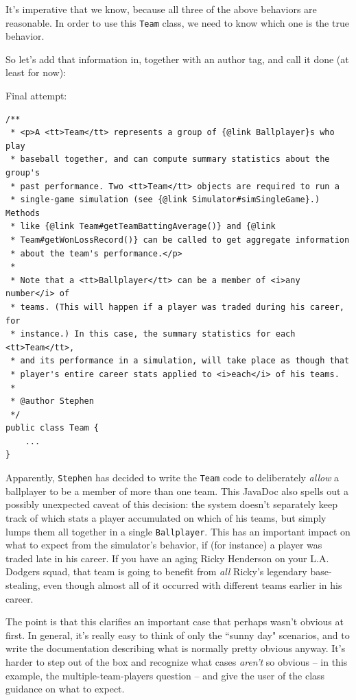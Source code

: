 It's imperative that we know, because all three of the above behaviors are
reasonable. In order to use this \texttt{Team} class, we need to know which
one is the true behavior.

So let's add that information in, together with an author tag, and call it
done (at least for now):

\pagebreak
Final attempt:
\vspace{-.15in}
\begin{Verbatim}[fontsize=\footnotesize,samepage=true,frame=single]
/**
 * <p>A <tt>Team</tt> represents a group of {@link Ballplayer}s who play
 * baseball together, and can compute summary statistics about the group's
 * past performance. Two <tt>Team</tt> objects are required to run a
 * single-game simulation (see {@link Simulator#simSingleGame}.) Methods
 * like {@link Team#getTeamBattingAverage()} and {@link 
 * Team#getWonLossRecord()} can be called to get aggregate information
 * about the team's performance.</p>
 * 
 * Note that a <tt>Ballplayer</tt> can be a member of <i>any number</i> of
 * teams. (This will happen if a player was traded during his career, for
 * instance.) In this case, the summary statistics for each <tt>Team</tt>, 
 * and its performance in a simulation, will take place as though that
 * player's entire career stats applied to <i>each</i> of his teams.
 *
 * @author Stephen
 */
public class Team {
    ...
}
\end{Verbatim}

Apparently, \texttt{Stephen} has decided to write the \texttt{Team} code to
deliberately \textit{allow} a ballplayer to be a member of more than one team.
This JavaDoc also spells out a possibly unexpected caveat of this decision:
the system doesn't separately keep track of which stats a player accumulated
on which of his teams, but simply lumps them all together in a single
\texttt{Ballplayer}. This has an important impact on what to expect from the
simulator's behavior, if (for instance) a player was traded late in his
career. If you have an aging Ricky Henderson on your L.A. Dodgers squad, that
team is going to benefit from \textit{all} Ricky's legendary base-stealing,
even though almost all of it occurred with different teams earlier in his
career.

The point is that this clarifies an important case that perhaps wasn't obvious
at first. In general, it's really easy to think of only the ``sunny day"
scenarios, and to write the documentation describing what is normally pretty
obvious anyway. It's harder to step out of the box and recognize what cases
\textit{aren't} so obvious -- in this example, the multiple-team-players
question -- and give the user of the class guidance on what to expect.


